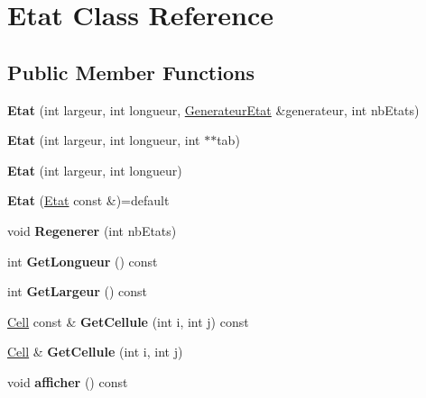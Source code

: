 \hypertarget{class_etat}{}\section{Etat Class Reference}
\label{class_etat}
\subsection*{Public Member Functions}
\begin{DoxyCompactItemize}
\item 
\mbox{\label{class_etat_a9de6f8f9bc1f9ec3296702a2ea9e7651}} 
{\bfseries Etat} (int largeur, int longueur, \mbox{\hyperlink{class_generateur_etat}{Generateur\+Etat}} \&generateur, int nb\+Etats)
\item 
\mbox{\label{class_etat_a4ab69207fc45fe1b193d3039eb456b32}} 
{\bfseries Etat} (int largeur, int longueur, int $\ast$$\ast$tab)
\item 
\mbox{\label{class_etat_a60fd78172b136c5011ccc840390ca378}} 
{\bfseries Etat} (int largeur, int longueur)
\item 
\mbox{\label{class_etat_a6137bc65c74f615b6dca276ed1300e83}} 
{\bfseries Etat} (\mbox{\hyperlink{class_etat}{Etat}} const \&)=default
\item 
\mbox{\label{class_etat_ad8cd3d55140d2b46784cb7623e998ee4}} 
void {\bfseries Regenerer} (int nb\+Etats)
\item 
\mbox{\label{class_etat_a0ee4d5777ef97c1c7781e0e14b01699e}} 
int {\bfseries Get\+Longueur} () const
\item 
\mbox{\label{class_etat_a8dc404996c461e3cd4ebd301bfdcae4a}} 
int {\bfseries Get\+Largeur} () const
\item 
\mbox{\label{class_etat_a58c4c395d05101a68e8a28a8c1f769e9}} 
\mbox{\hyperlink{class_cell}{Cell}} const  \& {\bfseries Get\+Cellule} (int i, int j) const
\item 
\mbox{\label{class_etat_addd390bbdb7b76148436a9a58c410f85}} 
\mbox{\hyperlink{class_cell}{Cell}} \& {\bfseries Get\+Cellule} (int i, int j)
\item 
\mbox{\label{class_etat_aeb0c23cfb166db846e567466dae0ebd1}} 
void {\bfseries afficher} () const
\end{DoxyCompactItemize}

